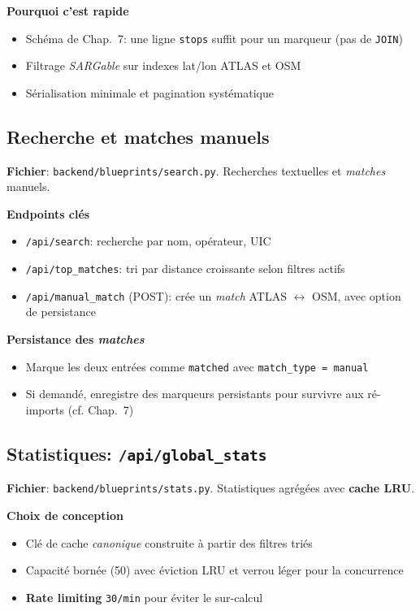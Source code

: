 \textbf{Pourquoi c'est rapide}
\begin{itemize}
  \item Schéma de Chap.~7: une ligne \texttt{stops} suffit pour un marqueur (pas de \texttt{JOIN})
  \item Filtrage \textit{SARGable} sur indexes lat/lon ATLAS et OSM
  \item Sérialisation minimale et pagination systématique
\end{itemize}

\subsection{Recherche et matches manuels}

\textbf{Fichier}: \texttt{backend/blueprints/search.py}. Recherches textuelles et \textit{matches} manuels.

\textbf{Endpoints clés}
\begin{itemize}
  \item \texttt{/api/search}: recherche par nom, opérateur, UIC
  \item \texttt{/api/top\_matches}: tri par distance croissante selon filtres actifs
  \item \texttt{/api/manual\_match} (POST): crée un \textit{match} ATLAS \(\leftrightarrow\) OSM, avec option de persistance
\end{itemize}

\textbf{Persistance des \textit{matches}}
\begin{itemize}
  \item Marque les deux entrées comme \texttt{matched} avec \texttt{match\_type = manual}
  \item Si demandé, enregistre des marqueurs persistants pour survivre aux ré-imports (cf. Chap.~7)
\end{itemize}

\subsection{Statistiques: \texttt{/api/global\_stats}}

\textbf{Fichier}: \texttt{backend/blueprints/stats.py}. Statistiques agrégées avec \textbf{cache LRU}.

\textbf{Choix de conception}
\begin{itemize}
  \item Clé de cache \textit{canonique} construite à partir des filtres triés
  \item Capacité bornée (50) avec éviction LRU et verrou léger pour la concurrence
  \item \textbf{Rate limiting} \texttt{30/min} pour éviter le sur-calcul
\end{itemize}

